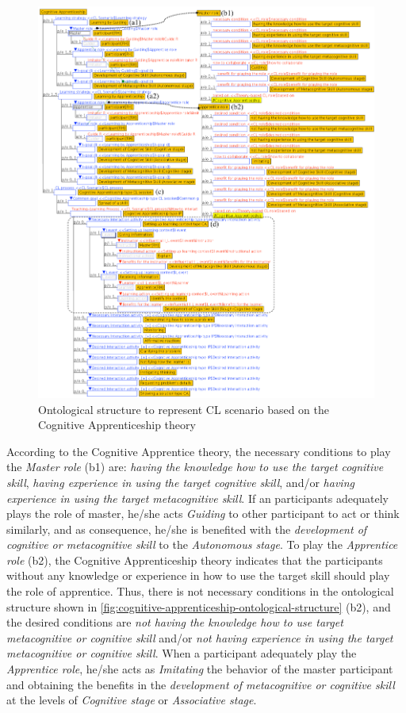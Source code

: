 \begin{figure}[htb]
 \caption{Ontological structure to represent CL scenario based on the Cognitive Apprenticeship theory}
 \label{fig:cognitive-apprenticeship-ontological-structure}
 \centering
 \includegraphics[width=1\textwidth]{images/chap-ontogacles1/cognitive-apprenticeship-ontological-structure.png}
 \fautor
\end{figure}

According to the Cognitive Apprentice theory, the necessary conditions to play the \emph{Master role} (b1) are: \emph{having the knowledge how to use the target cognitive skill}, \emph{having experience in using the target cognitive skill}, and/or \emph{having experience in using the target metacognitive skill}. If an participants adequately plays the role of master, he/she acts \emph{Guiding} to other participant to act or think similarly, and as consequence, he/she is benefited with the \emph{development of cognitive or metacognitive skill} to the \emph{Autonomous stage}. To play the \emph{Apprentice role} (b2), the Cognitive Apprenticeship theory indicates that the participants without any knowledge or experience in how to use the target skill should play the role of apprentice. Thus, there is not necessary conditions in the ontological structure shown in \autoref{fig:cognitive-apprenticeship-ontological-structure} (b2), and the desired conditions are \emph{not having the knowledge how to use target metacognitive or cognitive skill} and/or \emph{not having experience in using the target metacognitive or cognitive skill}. When a participant adequately play the \emph{Apprentice role}, he/she acts as \emph{Imitating} the behavior of the master participant and obtaining the benefits in the \emph{development of metacognitive or cognitive skill} at the levels of \emph{Cognitive stage} or \emph{Associative stage}.

